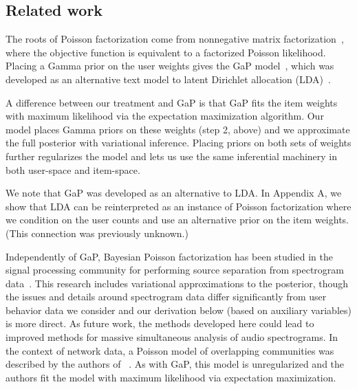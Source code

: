 \documentclass{sig-alternate}
\begin{document}
\subsection{Related work}

The roots of Poisson factorization come from nonnegative matrix
factorization~\cite{Lee:1999}, where the objective function is
equivalent to a factorized Poisson likelihood.  Placing a Gamma prior
on the user weights gives the GaP model~\cite{Canny:2004}, which was
developed as an alternative text model to latent Dirichlet allocation
(LDA)~\cite{Blei:2003b}.

A difference between our treatment and GaP is that GaP fits the item
weights with maximum likelihood via the expectation maximization
algorithm.  Our model places Gamma priors on these weights (step 2,
above) and we approximate the full posterior with variational
inference.  Placing priors on both sets of weights further regularizes
the model and lets us use the same inferential machinery in both
user-space and item-space.  


We note that GaP was developed as an alternative to LDA. In Appendix
A, we show that LDA can be reinterpreted as an instance of Poisson
factorization where we condition on the user counts and use an
alternative prior on the item weights.  (This connection was
previously unknown.)

Independently of GaP, Bayesian Poisson factorization has been studied
in the signal processing community for performing source separation
from spectrogram data~\cite{Cemgil:2009,Hoffman:2012}.  This research
includes variational approximations to the posterior, though the
issues and details around spectrogram data differ significantly from
user behavior data we consider and our derivation below (based on
auxiliary variables) is more direct.  As future work, the methods
developed here could lead to improved methods for massive simultaneous
analysis of audio spectrograms. In the context of network data, a
Poisson model of overlapping communities was described by the authors
of ~\cite{Ball:2011}. As with GaP, this model is unregularized and the
authors fit the model with maximum likelihood via expectation
maximization.
\end{document}
